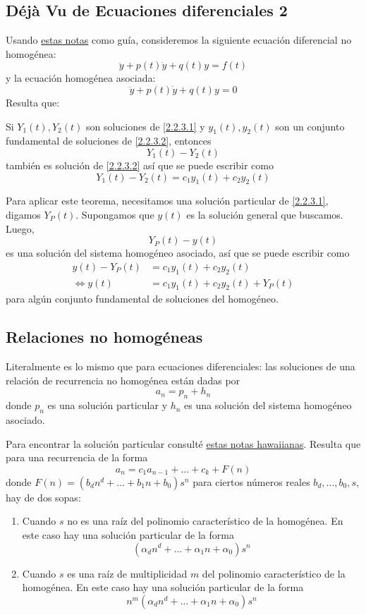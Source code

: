 \documentclass[spanish]{book}
\theoremstyle{definition}
\begin{document}
\subsection{Déjà Vu de Ecuaciones diferenciales 2}
Usando \href{https://tutorial.math.lamar.edu/Classes/DE/NonhomogeneousDE.aspx#mjx-eqn-eqeq1}{estas notas} como guía, consideremos la siguiente ecuación diferencial no homogénea:
\begin{equation}\label{2.2.3.1}
	\ddot{y}+p(t)\dot{y}+q(t)y=f(t)
\end{equation}
y la ecuación homogénea asociada:
\begin{equation}\label{2.2.3.2}
	\ddot{y}+p(t)\dot{y}+q(t)y=0
\end{equation}
Resulta que:
\begin{teo}
	Si $Y_1(t), Y_2(t)$ son soluciones de \eqref{2.2.3.1} y $y_1(t),y_2(t)$ son un conjunto fundamental de soluciones de \eqref{2.2.3.2}, entonces
	\[Y_1(t)-Y_2(t)\]
	también es solución de \eqref{2.2.3.2} así que se puede escribir como
	\[Y_1(t)-Y_2(t)=c_1y_1(t)+c_2y_2(t)\]
\end{teo}
	Para aplicar este teorema, necesitamos una solución particular de \eqref{2.2.3.1}, digamos $Y_P(t)$. Supongamos que $y(t)$ es la solución general que buscamos. Luego,
	\[Y_P(t)-y(t)\]
	es una solución del sistema homogéneo asociado, así que se puede escribir como 
	\begin{align*}
		y(t)-Y_P(t)&=c_1y_1(t)+c_2y_2(t)\\
	\iff y(t)&=c_1y_1(t)+c_2y_2(t)+Y_P(t)
	\end{align*}
	para algún conjunto fundamental de soluciones del homogéneo.
\fi
\subsection{Relaciones no homogéneas}
	Literalmente es lo mismo que para ecuaciones diferenciales: las soluciones de una relación de recurrencia no homogénea están dadas por
	\[a_n=p_n+h_n\]
	donde $p_n$ es una solución particular y $h_n$ es una solución del sistema homogéneo asociado.
	
	Para encontrar la solución particular consulté \href{https://courses.ics.hawaii.edu/ReviewICS241/morea/counting/RecurrenceRelations2-QA.pdf}{estas notas hawaiianas}. Resulta que para una recurrencia de la forma
	\[a_n=c_1a_{n-1}+\ldots+c_k+F(n)\]
	donde $F(n)=(b_dn^d+\ldots+b_1n+b_0)s^n$ para ciertos números reales $b_d,\ldots,b_0,s$, hay de dos sopas:
	\begin{enumerate}
		\item Cuando $s$ no es una raíz del polinomio característico de la homogénea. En este caso hay una solución particular de la forma
		\[(\alpha_dn^d+\ldots+\alpha_1n+\alpha_0)s^n\]
		
		\item Cuando $s$ es una raíz de multiplicidad $m$ del polinomio característico de la homogénea. En este caso hay una solución particular de la forma
		\[n^m(\alpha_dn^d+\ldots+\alpha_1n+\alpha_0)s^n\]
		
	\end{enumerate}
	
\end{document}
